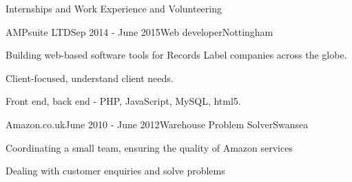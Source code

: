 \documentclass{resume} %
\begin{document}
\begin{rSection}{Internships and Work Experience and Volunteering}

  \begin{rSubsection}{AMPsuite LTD}{Sep 2014 - June 2015}{Web developer}{Nottingham}
        \item Building web-based software tools for Records Label companies across the globe.
        \item Client-focused, understand client needs.
        \item Front end, back end - PHP, JavaScript, MySQL, html5.
    \end{rSubsection}
    \begin{rSubsection}{Amazon.co.uk}{June 2010 - June 2012}{Warehouse Problem Solver}{Swansea}
        \item  Coordinating a small team, ensuring the quality of Amazon services 
        \item  Dealing with customer enquiries and solve problems
	\end{rSubsection}

\end{rSection}
\end{document}
